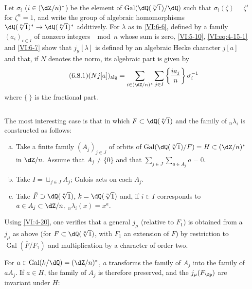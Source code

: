 \documentclass[oneside]{book}
\DeclareMathOperator{\gal}{Gal}
\newcounter{char}
\theoremstyle{sga-source}
\theoremstyle{sga-source-dash}
\theoremstyle{sga-source-dotdash}
\theoremstyle{sga-source-number-note-dash}
\theoremstyle{sga-source-note-number-dotdash}
\theoremstyle{sga-source-example-dotdash}
\theoremstyle{sga-source-inline-number}
\theoremstyle{sga-source-bare-number}
\theoremstyle{sga-source}
\newcommand{\PrintPage}[1]{}\newcommand{\MathPage}[1]{}\newcommand{\PrintCite}[2]{#1}\newcommand{\var}[3]{#2}
\begin{document}
Let $\sigma_i$ ($i\in (\dZ/n)^\ast$) be the element of 
$\gal(\dQ(\sqrt[n]{1})/\dQ)$ such that $\sigma_i(\zeta)=\zeta^i$ for $\zeta^n=1$, 
and write the group of algebraic homomorphisms 
$\dQ(\sqrt[n]{1})^\ast \to \dQ(\sqrt[n]{1})^\ast$ additively. For $\lambda$ as in 
\ref{VI:6-6}, defined by a family 
$(a_i)_{i\in I}$ of nonzero integers $\mod n$ whose sum is zero, 
\ref{VI:5-10}, \eqref{VI:eq:4-15-1} and \ref{VI:6-7} 
show that $j_\mu[\lambda]$ is defined by an algebraic Hecke character 
$j[a]$ and that, if $N$ denotes the norm, its algebraic part is 
given by 
\begin{equation*}\tag{6.8.1}\label{VI:eq:6-8-1}
  (N j[a])_\text{alg} = \sum_{i\in (\dZ/n)^\ast} \sum_{j\in I} \left\{ \frac{i a_j}{n} \right\} \sigma_i^{-1} 
\end{equation*}
  where $\{\ \}$ is the fractional part. 





\subsection{}\label{VI:6-9}

The most interesting case is that in which $F\subset \dQ(\sqrt[n]{1})$ and 
the family of $_n \lambda_i$ is constructed as follows: 
\begin{enumerate}[a)]
  \item Take a finite family $(A_j)_{j\in J}$ of orbits of 
    $\gal(\dQ(\sqrt[n]{1})/F)=H\subset (\dZ/n)^\ast$ in $\dZ/n$. Assume that 
    $A_j\ne\{0\}$ and that $\sum_{j\in J} \sum_{a\in A_j} a=0$. 
  \PrintPage{217}
\item Take $I=\sqcup_{j\in J} A_j$; Galois acts on each $A_j$. 
  \item Take $\bar F\supset \dQ(\sqrt[n]{1})$, $k=\dQ(\sqrt[n]{1})$ and, if 
    $i\in I$ corresponds to \var{$a\in A_j\subset (\dZ/n)^\ast$}{$a\in A_j\subset\dZ/n$}{S45-ASTRA-S-0037}, 
    $_n\lambda_i(x)=x^a$. 
\end{enumerate}

Using \ref{VI:4-20}, one verifies that a general $j_\mu$ (relative to 
$F_1$) is obtained from a $j_\mu$ as above (for 
$F\subset \dQ(\sqrt[n]{1})$, with $F_1$ an extension of $F$) by restriction to 
$\gal(\bar F/F_1)$ and multiplication by a character of order two. 

For $a\in \gal(k/\dQ)=(\dZ/n)^\ast$, $a$ transforms the family of $A_j$ 
into the family of $a A_j$. If $a\in H$, the family of $A_j$ is therefore preserved, 
and the $j_\mu(F_\fp)$ are invariant under $H$: 
\end{document}
